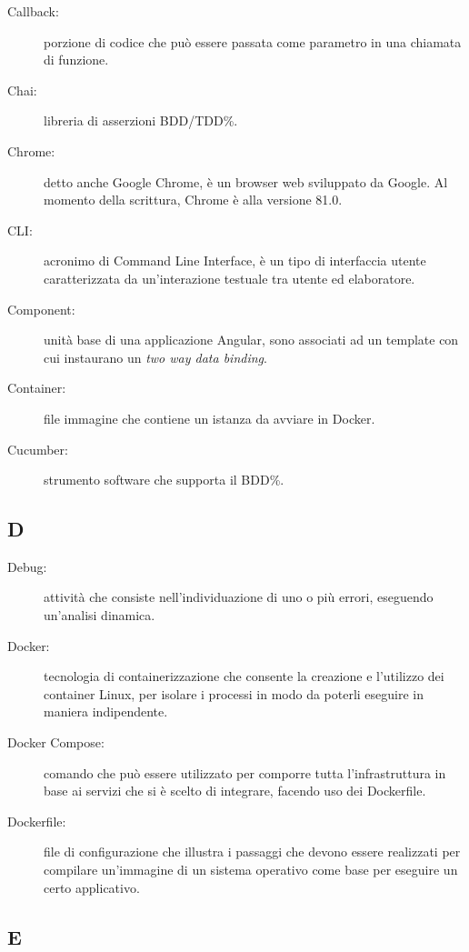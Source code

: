 \documentclass[../manuale-manutentore.tex]{subfiles}
\begin{document}
\begin{description}
    \item[Callback:] porzione di codice che può essere passata come parametro in una chiamata di funzione.
    \item[Chai:] libreria di asserzioni BDD/TDD\%.
    \item[Chrome:] detto anche Google Chrome, è un browser web sviluppato da Google. Al momento della scrittura, Chrome è alla versione 81.0.
    \item[CLI:] acronimo di Command Line Interface, è un tipo di interfaccia utente caratterizzata da un'interazione testuale tra utente ed elaboratore.
    \item[Component:] unità base di una applicazione Angular, sono associati ad un template con cui instaurano un \textit{two way data binding}.
    \item[Container:] file immagine che contiene un istanza da avviare in Docker.
    \item[Cucumber:] strumento software che supporta il BDD\%.
\end{description}

\subsection{D}

\begin{description}
    \item[Debug:] attività che consiste nell'individuazione di uno o più errori, eseguendo un'analisi dinamica.
    \item[Docker:] tecnologia di containerizzazione che consente la creazione e l'utilizzo dei container Linux, per isolare i processi in modo da poterli eseguire in maniera indipendente.
    \item[Docker Compose:] comando che può essere utilizzato per comporre tutta l'infrastruttura in base ai servizi che si è scelto di integrare, facendo uso dei Dockerfile.
    \item[Dockerfile:] file di configurazione che illustra i passaggi che devono essere realizzati per compilare un'immagine di un sistema operativo come base per eseguire un certo applicativo.
\end{description}

\subsection{E}
\end{document}

